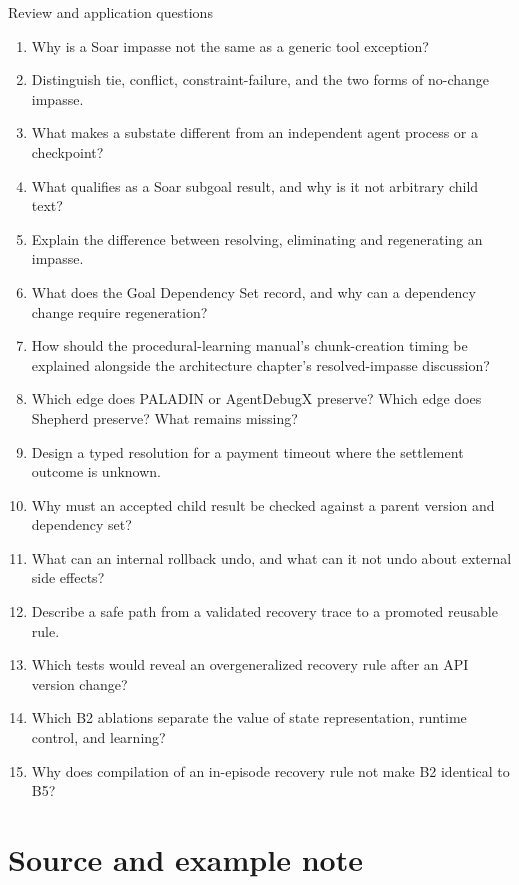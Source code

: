 \begin{reviewquestions}{Review and application questions}
\begin{enumerate}
  \item Why is a Soar impasse not the same as a generic tool exception?
  \item Distinguish tie, conflict, constraint-failure, and the two forms of no-change impasse.
  \item What makes a substate different from an independent agent process or a checkpoint?
  \item What qualifies as a Soar subgoal result, and why is it not arbitrary child text?
  \item Explain the difference between resolving, eliminating and regenerating an impasse.
  \item What does the Goal Dependency Set record, and why can a dependency change require regeneration?
  \item How should the procedural-learning manual's chunk-creation timing be explained alongside the architecture chapter's resolved-impasse discussion?
  \item Which edge does PALADIN or AgentDebugX preserve? Which edge does Shepherd preserve? What remains missing?
  \item Design a typed resolution for a payment timeout where the settlement outcome is unknown.
  \item Why must an accepted child result be checked against a parent version and dependency set?
  \item What can an internal rollback undo, and what can it not undo about external side effects?
  \item Describe a safe path from a validated recovery trace to a promoted reusable rule.
  \item Which tests would reveal an overgeneralized recovery rule after an API version change?
  \item Which B2 ablations separate the value of state representation, runtime control, and learning?
  \item Why does compilation of an in-episode recovery rule not make B2 identical to B5?
\end{enumerate}
\end{reviewquestions}

\section*{Source and example note}
{}

